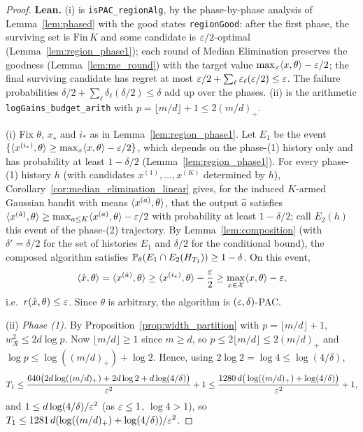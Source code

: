 \begin{proof}
\leanok
{}
\textbf{Lean.} (i) is \texttt{isPAC\_regionAlg}, by the phase-by-phase analysis of
Lemma~\ref{lem:phased} with the good states \texttt{regionGood}: after the first phase, the
surviving set is $\mathrm{Fin}\,K$ and some candidate is $\varepsilon/2$-optimal
(Lemma~\ref{lem:region_phase1}); each round of Median Elimination preserves the goodness
(Lemma~\ref{lem:me_round}) with the target value $\max_x\langle x, \theta \rangle - \varepsilon/2$; the final
surviving candidate has regret at most $\varepsilon/2 + \sum_\ell \varepsilon_\ell(\varepsilon/2) \le \varepsilon$. The
failure probabilities $\delta/2 + \sum_\ell \delta_\ell(\delta/2) \le \delta$ add up over the phases.
(ii) is the arithmetic \texttt{logGains\_budget\_arith} with $p = \lfloor m/d\rfloor + 1 \le 2(m/d)_+$.

(i) Fix $\theta$, $x_\star$ and $i_*$ as in Lemma~\ref{lem:region_phase1}. Let $E_1$ be the
event $\{\langle x^{(i_*)}, \theta \rangle \ge \max_x\langle x, \theta \rangle - \varepsilon/2\}$, which depends on the
phase-(1) history only and has probability at least $1-\delta/2$
(Lemma~\ref{lem:region_phase1}). For every phase-(1) history $h$ (with candidates
$x^{(1)},\dots,x^{(K)}$ determined by $h$), Corollary~\ref{cor:median_elimination_linear}
gives, for the induced $K$-armed Gaussian bandit with means $\langle x^{(a)}, \theta \rangle$, that the
output $\hat a$ satisfies $\langle x^{(\hat a)}, \theta \rangle \ge \max_{a\le K}\langle x^{(a)}, \theta \rangle - \varepsilon/2$
with probability at least $1 - \delta/2$; call $E_2(h)$ this event of the phase-(2)
trajectory. By Lemma~\ref{lem:composition} (with $\delta' = \delta/2$ for the set of
histories $E_1$ and $\delta/2$ for the conditional bound), the composed algorithm satisfies
$\mathbb{P}_\theta(E_1 \cap E_2(H_{T_1})) \ge 1 - \delta$. On this event,
\[
  \langle \hat{x}, \theta \rangle = \langle x^{(\hat a)}, \theta \rangle \ge \langle x^{(i_*)}, \theta \rangle - \frac{\varepsilon}2
  \ge \max_{x\in\mathcal{X}}\langle x, \theta \rangle - \varepsilon ,
\]
i.e.\ $r(\hat{x},\theta) \le \varepsilon$. Since $\theta$ is arbitrary, the algorithm is
$(\varepsilon,\delta)$-PAC.

(ii) \emph{Phase (1).} By Proposition~\ref{prop:width_partition} with $p = \lfloor m/d\rfloor + 1$,
$w_{\mathcal R}^2 \le 2d\log p$. Now $\lfloor m/d\rfloor \ge 1$ since $m \ge d$, so
$p \le 2\lfloor m/d\rfloor \le 2 (m/d)_+$ and $\log p \le \log((m/d)_+) + \log 2$.
Hence, using $2\log 2 = \log 4 \le \log(4/\delta)$,
\[
  T_1 \le \frac{640\big(2d\log((m/d)_+) + 2d\log2 + d\log(4/\delta)\big)}{\varepsilon^2} + 1
  \le \frac{1280\,d\big(\log((m/d)_+) + \log(4/\delta)\big)}{\varepsilon^2} + 1 ,
\]
and $1 \le d\log(4/\delta)/\varepsilon^2$ (as $\varepsilon \le 1$, $\log 4 > 1$), so
$T_1 \le 1281\,d(\log((m/d)_+) + \log(4/\delta))/\varepsilon^2$.


\end{proof}
